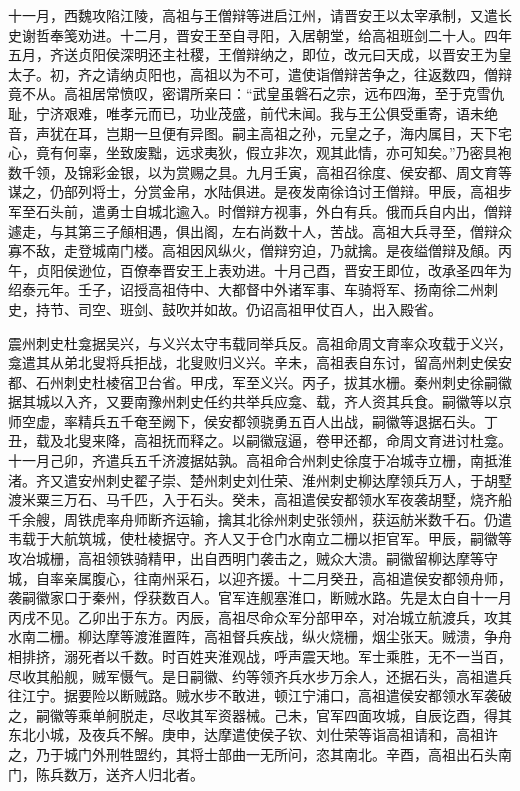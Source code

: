 \documentclass[]{article}
\begin{document}
十一月，西魏攻陷江陵，高祖与王僧辩等进启江州，请晋安王以太宰承制，又遣长史谢哲奉笺劝进。十二月，晋安王至自寻阳，入居朝堂，给高祖班剑二十人。四年五月，齐送贞阳侯深明还主社稷，王僧辩纳之，即位，改元曰天成，以晋安王为皇太子。初，齐之请纳贞阳也，高祖以为不可，遣使诣僧辩苦争之，往返数四，僧辩竟不从。高祖居常愤叹，密谓所亲曰：``武皇虽磐石之宗，远布四海，至于克雪仇耻，宁济艰难，唯孝元而已，功业茂盛，前代未闻。我与王公俱受重寄，语未绝音，声犹在耳，岂期一旦便有异图。嗣主高祖之孙，元皇之子，海内属目，天下宅心，竟有何辜，坐致废黜，远求夷狄，假立非次，观其此情，亦可知矣。''乃密具袍数千领，及锦彩金银，以为赏赐之具。九月壬寅，高祖召徐度、侯安都、周文育等谋之，仍部列将士，分赏金帛，水陆俱进。是夜发南徐诌讨王僧辩。甲辰，高祖步军至石头前，遣勇士自城北逾入。时僧辩方视事，外白有兵。俄而兵自内出，僧辩遽走，与其第三子頠相遇，俱出阁，左右尚数十人，苦战。高祖大兵寻至，僧辩众寡不敌，走登城南门楼。高祖因风纵火，僧辩穷迫，乃就擒。是夜缢僧辩及頠。丙午，贞阳侯逊位，百僚奉晋安王上表劝进。十月己酉，晋安王即位，改承圣四年为绍泰元年。壬子，诏授高祖侍中、大都督中外诸军事、车骑将军、扬南徐二州刺史，持节、司空、班剑、鼓吹并如故。仍诏高祖甲仗百人，出入殿省。

震州刺史杜龛据吴兴，与义兴太守韦载同举兵反。高祖命周文育率众攻载于义兴，龛遣其从弟北叟将兵拒战，北叟败归义兴。辛未，高祖表自东讨，留高州刺史侯安都、石州刺史杜棱宿卫台省。甲戌，军至义兴。丙子，拔其水栅。秦州刺史徐嗣徽据其城以入齐，又要南豫州刺史任约共举兵应龛、载，齐人资其兵食。嗣徽等以京师空虚，率精兵五千奄至阙下，侯安都领骁勇五百人出战，嗣徽等退据石头。丁丑，载及北叟来降，高祖抚而释之。以嗣徽寇逼，卷甲还都，命周文育进讨杜龛。十一月己卯，齐遣兵五千济渡据姑孰。高祖命合州刺史徐度于冶城寺立栅，南抵淮渚。齐又遣安州刺史翟子崇、楚州刺史刘仕荣、淮州刺史柳达摩领兵万人，于胡墅渡米粟三万石、马千匹，入于石头。癸未，高祖遣侯安都领水军夜袭胡墅，烧齐船千余艘，周铁虎率舟师断齐运输，擒其北徐州刺史张领州，获运舫米数千石。仍遣韦载于大航筑城，使杜棱据守。齐人又于仓门水南立二栅以拒官军。甲辰，嗣徽等攻冶城栅，高祖领铁骑精甲，出自西明门袭击之，贼众大溃。嗣徽留柳达摩等守城，自率亲属腹心，往南州采石，以迎齐援。十二月癸丑，高祖遣侯安都领舟师，袭嗣徽家口于秦州，俘获数百人。官军连舰塞淮口，断贼水路。先是太白自十一月丙戌不见。乙卯出于东方。丙辰，高祖尽命众军分部甲卒，对冶城立航渡兵，攻其水南二栅。柳达摩等渡淮置阵，高祖督兵疾战，纵火烧栅，烟尘张天。贼溃，争舟相排挤，溺死者以千数。时百姓夹淮观战，呼声震天地。军士乘胜，无不一当百，尽收其船舰，贼军慑气。是日嗣徽、约等领齐兵水步万余人，还据石头，高祖遣兵往江宁。据要险以断贼路。贼水步不敢进，顿江宁浦口，高祖遣侯安都领水军袭破之，嗣徽等乘单舸脱走，尽收其军资器械。己未，官军四面攻城，自辰讫酉，得其东北小城，及夜兵不解。庚申，达摩遣使侯子钦、刘仕荣等诣高祖请和，高祖许之，乃于城门外刑牲盟约，其将士部曲一无所问，恣其南北。辛酉，高祖出石头南门，陈兵数万，送齐人归北者。
\end{document}
